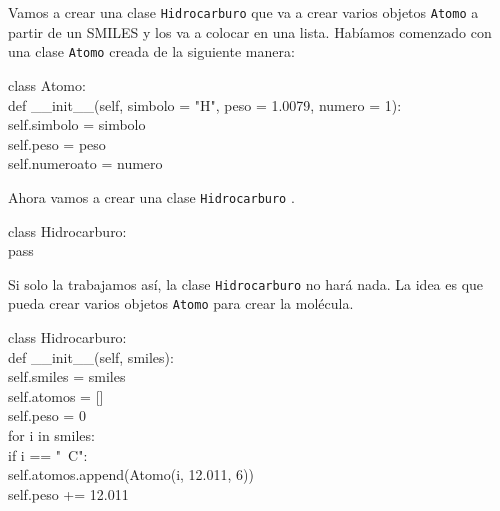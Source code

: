 \documentclass[10pt,letterpaper]{article}
\newcommand{\inlinecode}[1]{
\colorbox{light-gray}{\texttt{#1}}
}
\newenvironment{Code}
{
\begin{lrbox}{\selvestebox}%
\begin{minipage}{\dimexpr\columnwidth-2\fboxsep\relax}
\fontfamily{\ttdefault}\selectfont
}
{\end{minipage}\end{lrbox}%
\begin{center}
\colorbox{light-gray}{\usebox{\selvestebox}}
\end{center}
}
\begin{document}
Vamos a crear una clase \inlinecode{Hidrocarburo} que va a crear varios objetos \inlinecode{Atomo} a partir de un SMILES y los va a colocar en una lista. Hab\'iamos comenzado con una clase \inlinecode{Atomo} creada de la siguiente manera:

\begin{footnotesize}
\begin{Code}
class Atomo:\\
\hspace*{4mm} def \_\_init\_\_(self, simbolo = "H", peso = 1.0079, numero = 1):\\
\hspace*{10mm} self.simbolo = simbolo\\
\hspace*{10mm} self.peso = peso\\
\hspace*{10mm} self.numeroato = numero
\end{Code}
\end{footnotesize}

Ahora vamos a crear una clase \inlinecode{Hidrocarburo}.

\begin{footnotesize}
\begin{Code}
class Hidrocarburo:\\
\hspace*{4mm} pass
\end{Code}
\end{footnotesize}

Si solo la trabajamos as\'i, la clase \inlinecode{Hidrocarburo} no har\'a nada. La idea es que pueda crear varios objetos \inlinecode{Atomo} para crear la mol\'ecula.

\begin{footnotesize}
\begin{Code}
class Hidrocarburo:\\
\hspace*{4mm} def \_\_init\_\_(self, smiles):\\
\hspace*{10mm} self.smiles = smiles\\
\hspace*{10mm} self.atomos = []\\
\hspace*{10mm} self.peso = 0\\
\hspace*{10mm} for i in smiles:\\
\hspace*{17mm} if i == "\ \hspace*{-1.5mm}C":\\
\hspace*{23mm} self.atomos.append(Atomo(i, 12.011, 6))\\
\hspace*{23mm} self.peso += 12.011
\end{Code}
\end{footnotesize}
\end{document}
